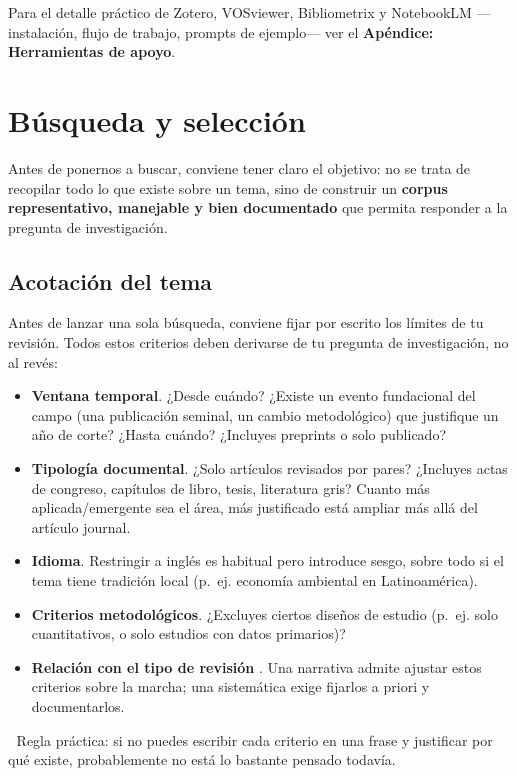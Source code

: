 \documentclass[
]{book}
\begin{document}
Para el detalle práctico de Zotero, VOSviewer, Bibliometrix y NotebookLM ---instalación, flujo de trabajo, prompts de ejemplo--- ver el \textbf{Apéndice: Herramientas de apoyo}.

\chapter{Búsqueda y selección}\label{buxfasqueda-y-selecciuxf3n}

Antes de ponernos a buscar, conviene tener claro el objetivo: no se trata de recopilar todo lo que existe sobre un tema, sino de construir un \textbf{corpus representativo, manejable y bien documentado} que permita responder a la pregunta de investigación.

\section{Acotación del tema}\label{acotaciuxf3n-del-tema}

Antes de lanzar una sola búsqueda, conviene fijar por escrito los límites de tu revisión. Todos estos criterios deben derivarse de tu pregunta de investigación, no al revés:

\begin{itemize}
\item
  \textbf{Ventana temporal}. ¿Desde cuándo? ¿Existe un evento fundacional del campo (una publicación seminal, un cambio metodológico) que justifique un año de corte? ¿Hasta cuándo? ¿Incluyes preprints o solo publicado?
\item
  \textbf{Tipología documental}. ¿Solo artículos revisados por pares? ¿Incluyes actas de congreso, capítulos de libro, tesis, literatura gris? Cuanto más aplicada/emergente sea el área, más justificado está ampliar más allá del artículo journal.
\item
  \textbf{Idioma}. Restringir a inglés es habitual pero introduce sesgo, sobre todo si el tema tiene tradición local (p.~ej. economía ambiental en Latinoamérica).
\item
  \textbf{Criterios metodológicos}. ¿Excluyes ciertos diseños de estudio (p.~ej. solo cuantitativos, o solo estudios con datos primarios)?
\item
  \textbf{Relación con el tipo de revisión} . Una narrativa admite ajustar estos criterios sobre la marcha; una sistemática exige fijarlos a priori y documentarlos.
\end{itemize}

👣 Regla práctica: si no puedes escribir cada criterio en una frase y justificar por qué existe, probablemente no está lo bastante pensado todavía.
\end{document}
